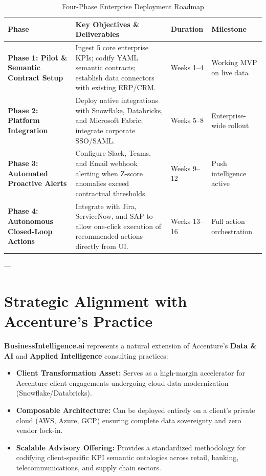 \documentclass[11pt,a4paper]{article}
\begin{document}
\begin{table}[h!]
\centering
\small
\begin{tabularx}{\textwidth}{>{\raggedright\arraybackslash}p{4.5cm} >{\raggedright\arraybackslash}X l l}
\toprule
\textbf{Phase} & \textbf{Key Objectives \& Deliverables} & \textbf{Duration} & \textbf{Milestone} \\
\midrule
\textbf{Phase 1: Pilot \& Semantic Contract Setup} & Ingest 5 core enterprise KPIs; codify YAML semantic contracts; establish data connectors with existing ERP/CRM. & Weeks 1--4 & Working MVP on live data \\
\textbf{Phase 2: Platform Integration} & Deploy native integrations with Snowflake, Databricks, and Microsoft Fabric; integrate corporate SSO/SAML. & Weeks 5--8 & Enterprise-wide rollout \\
\textbf{Phase 3: Automated Proactive Alerts} & Configure Slack, Teams, and Email webhook alerting when Z-score anomalies exceed contractual thresholds. & Weeks 9--12 & Push intelligence active \\
\textbf{Phase 4: Autonomous Closed-Loop Actions} & Integrate with Jira, ServiceNow, and SAP to allow one-click execution of recommended actions directly from UI. & Weeks 13--16 & Full action orchestration \\
\bottomrule
\end{tabularx}
\caption{Four-Phase Enterprise Deployment Roadmap}
\end{table}

---

\section{Strategic Alignment with Accenture's Practice}

\textbf{BusinessIntelligence.ai} represents a natural extension of Accenture's \textbf{Data \& AI} and \textbf{Applied Intelligence} consulting practices:
\begin{itemize}[leftmargin=*]
    \item \textbf{Client Transformation Asset:} Serves as a high-margin accelerator for Accenture client engagements undergoing cloud data modernization (Snowflake/Databricks).
    \item \textbf{Composable Architecture:} Can be deployed entirely on a client's private cloud (AWS, Azure, GCP) ensuring complete data sovereignty and zero vendor lock-in.
    \item \textbf{Scalable Advisory Offering:} Provides a standardized methodology for codifying client-specific KPI semantic ontologies across retail, banking, telecommunications, and supply chain sectors.
\end{itemize}
\end{document}
